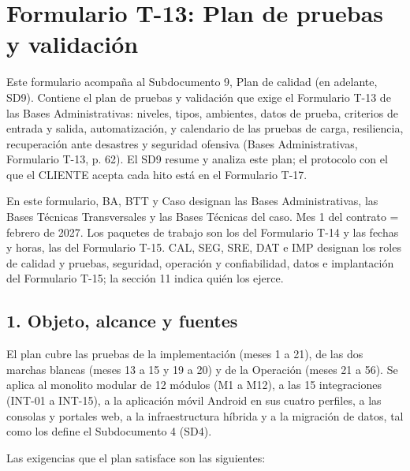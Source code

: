 \chapter*{Formulario T-13: Plan de pruebas y validación}
\label{cap:t13}

Este formulario acompaña al Subdocumento 9, Plan de calidad (en adelante, SD9). Contiene el plan de pruebas y validación que exige el Formulario T-13 de las Bases Administrativas: niveles, tipos, ambientes, datos de prueba, criterios de entrada y salida, automatización, y calendario de las pruebas de carga, resiliencia, recuperación ante desastres y seguridad ofensiva (Bases Administrativas, Formulario T-13, p. 62). El SD9 resume y analiza este plan; el protocolo con el que el CLIENTE acepta cada hito está en el Formulario T-17.

En este formulario, BA, BTT y Caso designan las Bases Administrativas, las Bases Técnicas Transversales y las Bases Técnicas del caso. Mes 1 del contrato = febrero de 2027. Los paquetes de trabajo son los del Formulario T-14 y las fechas y horas, las del Formulario T-15. CAL, SEG, SRE, DAT e IMP designan los roles de calidad y pruebas, seguridad, operación y confiabilidad, datos e implantación del Formulario T-15; la sección 11 indica quién los ejerce.

\section*{1. Objeto, alcance y fuentes}

El plan cubre las pruebas de la implementación (meses 1 a 21), de las dos marchas blancas (meses 13 a 15 y 19 a 20) y de la Operación (meses 21 a 56). Se aplica al monolito modular de 12 módulos (M1 a M12), a las 15 integraciones (INT-01 a INT-15), a la aplicación móvil Android en sus cuatro perfiles, a las consolas y portales web, a la infraestructura híbrida y a la migración de datos, tal como los define el Subdocumento 4 (SD4).

Las exigencias que el plan satisface son las siguientes:


